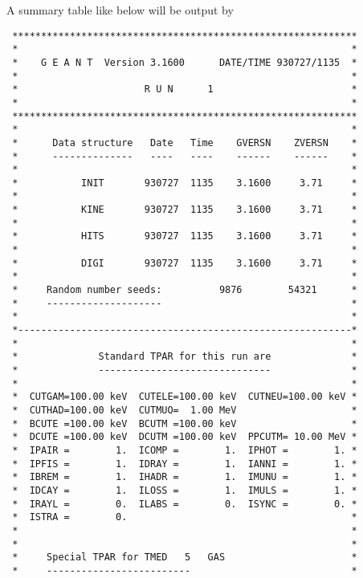 A summary table like below will be output by 
\begin{verbatim}
 ************************************************************
 *                                                          *
 *    G E A N T  Version 3.1600      DATE/TIME 930727/1135  *
 *                                                          *
 *                      R U N      1                        *
 *                                                          *
 ************************************************************
 *                                                          *
 *      Data structure   Date   Time    GVERSN    ZVERSN    *
 *      --------------   ----   ----    ------    ------    *
 *                                                          *
 *           INIT       930727  1135    3.1600     3.71     *
 *                                                          *
 *           KINE       930727  1135    3.1600     3.71     *
 *                                                          *
 *           HITS       930727  1135    3.1600     3.71     *
 *                                                          *
 *           DIGI       930727  1135    3.1600     3.71     *
 *                                                          *
 *     Random number seeds:          9876        54321      *
 *     --------------------                                 *
 *                                                          *
 *----------------------------------------------------------*
 *                                                          *
 *              Standard TPAR for this run are              *
 *              ------------------------------              *
 *                                                          *
 *  CUTGAM=100.00 keV  CUTELE=100.00 keV  CUTNEU=100.00 keV *
 *  CUTHAD=100.00 keV  CUTMUO=  1.00 MeV                    *
 *  BCUTE =100.00 keV  BCUTM =100.00 keV                    *
 *  DCUTE =100.00 keV  DCUTM =100.00 keV  PPCUTM= 10.00 MeV *
 *  IPAIR =        1.  ICOMP =        1.  IPHOT =        1. *
 *  IPFIS =        1.  IDRAY =        1.  IANNI =        1. *
 *  IBREM =        1.  IHADR =        1.  IMUNU =        1. *
 *  IDCAY =        1.  ILOSS =        1.  IMULS =        1. *
 *  IRAYL =        0.  ILABS =        0.  ISYNC =        0. *
 *  ISTRA =        0.                                       *
 *                                                          *
 *                                                          *
 *     Special TPAR for TMED   5   GAS                      *
 *     -------------------------                            *

\end{verbatim}
